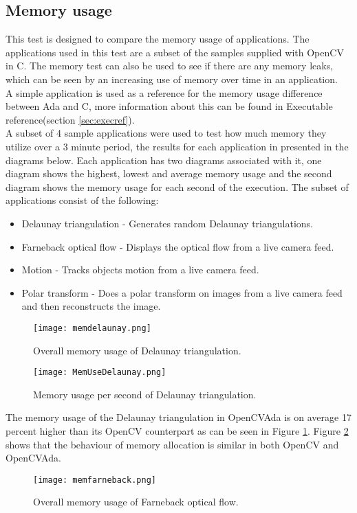 \subsection{Memory usage}
This test is designed to compare the memory usage of applications. The applications used in this test are a subset of the samples supplied with OpenCV in C. The memory test can also be used to see if there are any memory leaks, which can be seen by an increasing use of memory over time in an application.
\\
A simple application is used as a reference for the memory usage difference between Ada and C, more information about this can be found in Executable reference(section \ref{sec:execref}).
\\
A subset of 4 sample applications were used to test how much memory they utilize over a 3 minute period, the results for each application in presented in the diagrams below. Each application has two diagrams associated with it, one diagram shows the highest, lowest and average memory usage and the second diagram shows the memory usage for each second of the execution.
The subset of applications consist of the following:
\begin{itemize}
\item Delaunay triangulation - Generates random Delaunay triangulations.
\item Farneback optical flow - Displays the optical flow from a live camera feed.
\item Motion - Tracks objects motion from a live camera feed.
\item Polar transform - Does a polar transform on images from a live camera feed and then reconstructs the image.
\end{itemize}
\begin{figure}
\centering
\texttt{[image: memdelaunay.png]}
\caption{Overall memory usage of Delaunay triangulation.}
\label{fig:memdelaunay}
\end{figure}
\begin{figure}
\centering
\texttt{[image: MemUseDelaunay.png]}
\caption{Memory usage per second of Delaunay triangulation.}
\label{fig:MemUseDelaunay}
\end{figure}
The memory usage of the Delaunay triangulation in OpenCVAda is on average 17 percent higher than its OpenCV counterpart as can be seen in Figure \ref{fig:memdelaunay}. Figure \ref{fig:MemUseDelaunay} shows that the behaviour of memory allocation is similar in both OpenCV and OpenCVAda.
\begin{figure}
\centering
\texttt{[image: memfarneback.png]}
\caption{Overall memory usage of Farneback optical flow.}
\label{fig:memfarneback}
\end{figure}
